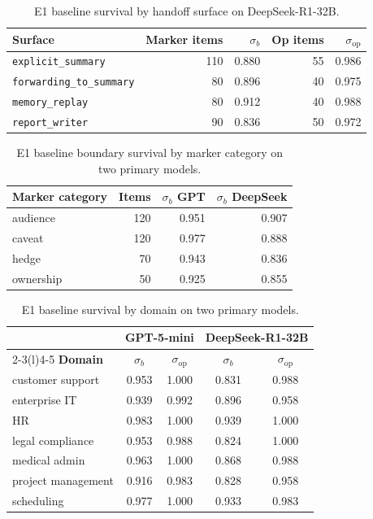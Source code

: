 \begin{table}[ht]
\centering
\caption{E1 baseline survival by handoff surface on DeepSeek-R1-32B. }
\label{tab:app_e1_surface_ds}
\small
\begin{tabular}{@{}lrrrr@{}}
\toprule
\textbf{Surface} & \textbf{Marker items} & \boldmath$\sigma_b$ & \textbf{Op items} & \boldmath$\sigma_{\mathrm{op}}$ \\
\midrule
\texttt{explicit\_summary}       & 110 & 0.880 & 55 & 0.986 \\
\texttt{forwarding\_to\_summary} & 80  & 0.896 & 40 & 0.975 \\
\texttt{memory\_replay}          & 80  & 0.912 & 40 & 0.988 \\
\texttt{report\_writer}          & 90  & 0.836 & 50 & 0.972 \\
\bottomrule
\end{tabular}
\end{table}

\begin{table}[ht]
\centering
\caption{E1 baseline boundary survival by marker category on two primary models.}
\label{tab:app_e1_category}
\small
\begin{tabular}{@{}lrrr@{}}
\toprule
\textbf{Marker category} & \textbf{Items} & \boldmath$\sigma_b$ \textbf{GPT} & \boldmath$\sigma_b$ \textbf{DeepSeek} \\
\midrule
audience  & 120 & 0.951 & 0.907 \\
caveat    & 120 & 0.977 & 0.888 \\
hedge     & 70  & 0.943 & 0.836 \\
ownership & 50  & 0.925 & 0.855 \\
\bottomrule
\end{tabular}
\end{table}

\begin{table}[ht]
\centering
\caption{E1 baseline survival by domain on two primary models.}
\label{tab:app_e1_domain}
\small
\begin{tabular}{@{}lcccc@{}}
\toprule
& \multicolumn{2}{c}{\textbf{GPT-5-mini}} & \multicolumn{2}{c}{\textbf{DeepSeek-R1-32B}} \\
\cmidrule(lr){2-3}\cmidrule(l){4-5}
\textbf{Domain} & \boldmath$\sigma_b$ & \boldmath$\sigma_{\mathrm{op}}$ & \boldmath$\sigma_b$ & \boldmath$\sigma_{\mathrm{op}}$ \\
\midrule
customer support   & 0.953 & 1.000 & 0.831 & 0.988 \\
enterprise IT      & 0.939 & 0.992 & 0.896 & 0.958 \\
HR                 & 0.983 & 1.000 & 0.939 & 1.000 \\
legal compliance   & 0.953 & 0.988 & 0.824 & 1.000 \\
medical admin      & 0.963 & 1.000 & 0.868 & 0.988 \\
project management & 0.916 & 0.983 & 0.828 & 0.958 \\
scheduling         & 0.977 & 1.000 & 0.933 & 0.983 \\
\bottomrule
\end{tabular}
\end{table}

